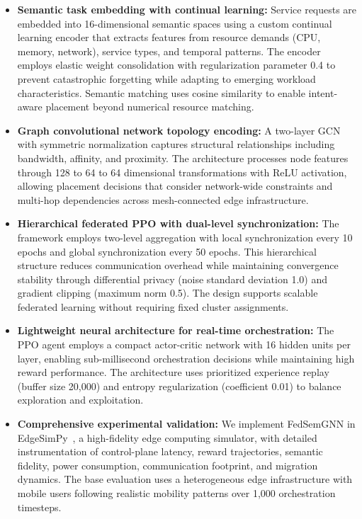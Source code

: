 \documentclass[conference]{IEEEtran}
\begin{document}
	\begin{itemize}
		\item \textbf{Semantic task embedding with continual learning:} Service requests are embedded into 16-dimensional semantic spaces using a custom continual learning encoder that extracts features from resource demands (CPU, memory, network), service types, and temporal patterns. The encoder employs elastic weight consolidation with regularization parameter 0.4 to prevent catastrophic forgetting while adapting to emerging workload characteristics. Semantic matching uses cosine similarity to enable intent-aware placement beyond numerical resource matching.
		
		\item \textbf{Graph convolutional network topology encoding:} A two-layer GCN with symmetric normalization captures structural relationships including bandwidth, affinity, and proximity. The architecture processes node features through 128 to 64 to 64 dimensional transformations with ReLU activation, allowing placement decisions that consider network-wide constraints and multi-hop dependencies across mesh-connected edge infrastructure.
		
		\item \textbf{Hierarchical federated PPO with dual-level synchronization:} The framework employs two-level aggregation with local synchronization every 10 epochs and global synchronization every 50 epochs. This hierarchical structure reduces communication overhead while maintaining convergence stability through differential privacy (noise standard deviation 1.0) and gradient clipping (maximum norm 0.5). The design supports scalable federated learning without requiring fixed cluster assignments.
		
		\item \textbf{Lightweight neural architecture for real-time orchestration:} The PPO agent employs a compact actor-critic network with 16 hidden units per layer, enabling sub-millisecond orchestration decisions while maintaining high reward performance. The architecture uses prioritized experience replay (buffer size 20,000) and entropy regularization (coefficient 0.01) to balance exploration and exploitation.
		
		\item \textbf{Comprehensive experimental validation:} We implement FedSemGNN in EdgeSimPy~\cite{souza2023edgesimpy}, a high-fidelity edge computing simulator, with detailed instrumentation of control-plane latency, reward trajectories, semantic fidelity, power consumption, communication footprint, and migration dynamics. The base evaluation uses a heterogeneous edge infrastructure with mobile users following realistic mobility patterns over 1,000 orchestration timesteps.
		

\end{itemize}
\end{document}
